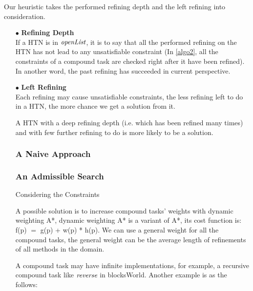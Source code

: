 Our heuristic takes the performed refining depth and the left refining into consideration. 
\begin{itemize}
\item[$\bullet$] \textbf{Refining Depth}\\
If a HTN is in $\emph{openList}$, it is to say that all the performed refining on the HTN has not lead to any unsatisfiable constraint (In \autoref{algo2}, all the constraints of a compound task are checked right after it have been refined). In another word, the past refining has succeeded in current perspective.
\item[$\bullet$] \textbf{Left Refining}\\
Each refining may cause unsatisfiable constraints, the less refining left to do in a HTN, the more chance we get a solution from it.

A HTN with a deep refining depth (i.e. which has been refined many times) and with few further refining to do is more likely to be a solution.

\subsubsection*{A Naive Approach}

\subsubsection*{An Admissible Search}

Considering the Constraints










 A possible solution is to increase compound tasks’ weights with dynamic weighting A*, dynamic weighting A* is a variant of A*, its cost function is: f(p) $=$ g(p) + w(p) * h(p). We can use a general weight for all the compound tasks, the general weight can be the average length of refinements of all methods in the domain.
 
 
 
 
 
 
 
 
 
 
 
 
 
 
 
 A compound task may have infinite implementations, for example, a recursive compound task like $\emph{reverse}$ in blocksWorld. Another example is as the follows:


\end{itemize}
